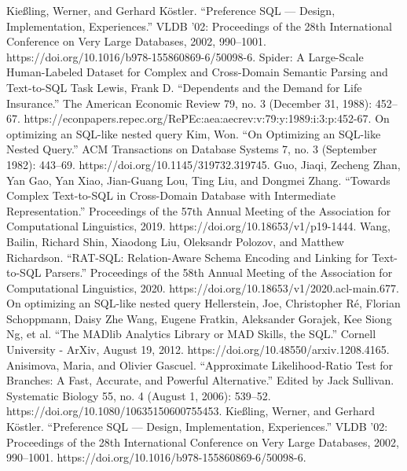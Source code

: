 \documentclass[journal]{IEEEtran}
\begin{document}
\begin{thebibliography}{1.7}
          \color{cyan}Kießling, Werner, and Gerhard Köstler. “Preference SQL — Design, Implementation, Experiences.” VLDB ’02: Proceedings of the 28th International Conference on Very Large Databases, 2002, 990–1001. https://doi.org/10.1016/b978-155860869-6/50098-6.\color{black}
         \color{cyan} Spider: A Large-Scale Human-Labeled Dataset for Complex and Cross-Domain Semantic Parsing and Text-to-SQL Task \color{black}
          \color{cyan} Lewis, Frank D. “Dependents and the Demand for Life Insurance.” The American Economic Review 79, no. 3 (December 31, 1988): 452–67. https://econpapers.repec.org/RePEc:aea:aecrev:v:79:y:1989:i:3:p:452-67. \color{black}
         \color{cyan}On optimizing an SQL-like nested query \color{black}
          \color{cyan}Kim, Won. “On Optimizing an SQL-like Nested Query.” ACM Transactions on Database Systems 7, no. 3 (September 1982): 443–69. https://doi.org/10.1145/319732.319745.\color{black}
         \color{cyan} Guo, Jiaqi, Zecheng Zhan, Yan Gao, Yan Xiao, Jian-Guang Lou, Ting Liu, and Dongmei Zhang. “Towards Complex Text-to-SQL in Cross-Domain Database with Intermediate Representation.” Proceedings of the 57th Annual Meeting of the Association for Computational Linguistics, 2019. https://doi.org/10.18653/v1/p19-1444.\color{black}
         \color{cyan}Wang, Bailin, Richard Shin, Xiaodong Liu, Oleksandr Polozov, and Matthew Richardson. “RAT-SQL: Relation-Aware Schema Encoding and Linking for Text-to-SQL Parsers.” Proceedings of the 58th Annual Meeting of the Association for Computational Linguistics, 2020. https://doi.org/10.18653/v1/2020.acl-main.677.\color{black}
         \color{cyan}On optimizing an SQL-like nested query \color{black}
          \color{cyan}Hellerstein, Joe, Christopher Ré, Florian Schoppmann, Daisy Zhe Wang, Eugene Fratkin, Aleksander Gorajek, Kee Siong Ng, et al. “The MADlib Analytics Library or MAD Skills, the SQL.” Cornell University - ArXiv, August 19, 2012. https://doi.org/10.48550/arxiv.1208.4165.\color{black}
         \color{cyan}Anisimova, Maria, and Olivier Gascuel. “Approximate Likelihood-Ratio Test for Branches: A Fast, Accurate, and Powerful Alternative.” Edited by Jack Sullivan. Systematic Biology 55, no. 4 (August 1, 2006): 539–52. https://doi.org/10.1080/10635150600755453.\color{black}
         \color{cyan}Kießling, Werner, and Gerhard Köstler. “Preference SQL — Design, Implementation, Experiences.” VLDB ’02: Proceedings of the 28th International Conference on Very Large Databases, 2002, 990–1001. https://doi.org/10.1016/b978-155860869-6/50098-6.\color{black}

\end{thebibliography}
\end{document}
